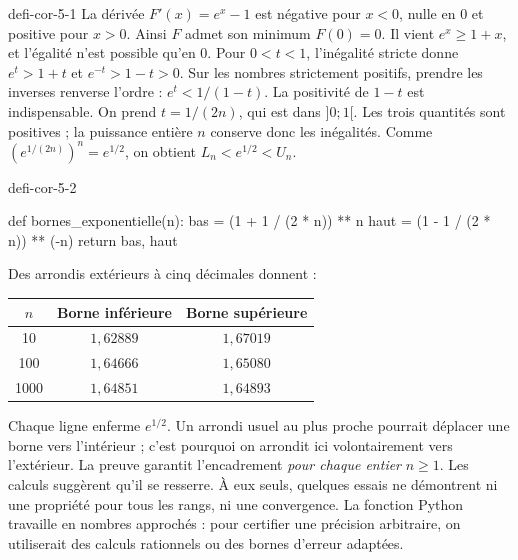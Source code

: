 \begin{blocEdition}{defi-cor-5-1}
La dérivée $F'(x)=e^x-1$ est négative pour $x<0$, nulle en 0 et positive pour $x>0$.
Ainsi $F$ admet son minimum $F(0)=0$. Il vient $e^x\geq1+x$, et l'égalité
n'est possible qu'en 0.
Pour $0<t<1$, l'inégalité stricte donne $e^t>1+t$ et $e^{-t}>1-t>0$.
Sur les nombres strictement positifs, prendre les inverses renverse l'ordre :
$e^t<1/(1-t)$. La positivité de $1-t$ est indispensable.
On prend $t=1/(2n)$, qui est dans $]0;1[$. Les trois quantités sont positives ;
la puissance entière $n$ conserve donc les inégalités. Comme $(e^{1/(2n)})^n=e^{1/2}$,
on obtient $L_n<e^{1/2}<U_n$.
\end{blocEdition}

\begin{blocEdition}{defi-cor-5-2}
\begin{python}
def bornes_exponentielle(n):
    bas = (1 + 1 / (2 * n)) ** n
    haut = (1 - 1 / (2 * n)) ** (-n)
    return bas, haut
\end{python}
Des arrondis extérieurs à cinq décimales donnent :
\begin{center}\begin{tabular}{@{}ccc@{}}\toprule
$n$ & Borne inférieure & Borne supérieure\\\midrule
10 & $1{,}62889$ & $1{,}67019$\\
100 & $1{,}64666$ & $1{,}65080$\\
1000 & $1{,}64851$ & $1{,}64893$\\\bottomrule\end{tabular}\end{center}
Chaque ligne enferme $e^{1/2}$. Un arrondi usuel au plus proche pourrait
déplacer une borne vers l'intérieur ; c'est pourquoi on arrondit ici volontairement vers l'extérieur.
La preuve garantit l'encadrement \emph{pour chaque entier} $n\geq1$.
Les calculs suggèrent qu'il se resserre. À eux seuls, quelques essais ne démontrent
ni une propriété pour tous les rangs, ni une convergence.
La fonction Python travaille en nombres approchés : pour certifier une précision arbitraire,
on utiliserait des calculs rationnels ou des bornes d'erreur adaptées.
\end{blocEdition}

